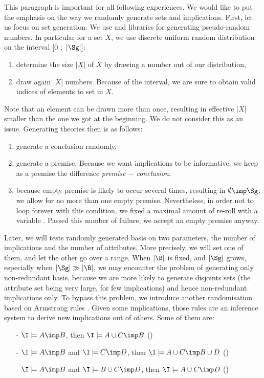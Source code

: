 This paragraph is important for all following experiences.
We would like to put the emphasis on the way we randomly generate sets and 
implications. First, let us focus on set generation. We use  
and  libraries for generating pseudo-random numbers. In particular 
for a set $X$, we use discrete uniform random distribution on the interval 
$\lbrack 0 \ ; \ |\Sg| \rbrack$:
\begin{enumerate}
	\item determine the size $|X|$ of $X$ by drawing a number out of our 
	distribution,
	\item draw again $|X|$ numbers. Because of the interval, we are sure to
	obtain valid indices of elements to set in $X$.
\end{enumerate}
\noindent Note that an element can be drawn more than once, resulting in 
effective $|X|$ smaller than the one we got at the beginning. We do not consider
this as an issue. Generating theories then is as follows:
\begin{enumerate}
	\item generate a conclusion randomly,
	\item generate a premise. Because we want implications to be informative,
	we keep as a premise the difference \textit{premise $-$ conclusion}.
	\item because empty premise is likely to occur several times, resulting in
	$\emptyset \imp \Sg$, we allow for no more than one empty premise. 
	Nevertheless, in order not to loop forever with this condition, we fixed
	a maximal amount of re-roll with a variable . Passed this 
	number of failure, we accept an empty premise anyway.
\end{enumerate}
\noindent Later, we will tests randomly generated basis on two parameters, the number of implications and the number of attributes. More precisely, we will set one of them, and let the other go over a range. When $|\B|$ is fixed, and $|\Sg|$ grows, especially when $|\Sg| \gg |\B|$, we may encounter the problem of generating only non-redundant basis, because we are more likely to generate
disjoints sets (the attribute set being very large, for few implications) and hence non-redundant implications only. To bypass this problem, we introduce
another randomisation based on Armstrong rules \cite{armstrong_dependency_1974, b._ganter_conceptual_2016}. Given some implications, those rules are an inference system to derive new implications out of others. Some of them are:
\begin{itemize}
	\item[-] $\I \models A \imp B$, then $\I \models A \cup C \imp B$ ()
	\item[-] $\I \models A \imp B$ and $ \I \models C \imp D$, then $\I \models A \cup C \imp B \cup D$ ()
	\item[-] $\I \models A \imp B$ and $ \I \models B \cup C \imp D$, then 
	$\I \models A \cup C \imp D$ ()
\end{itemize}

